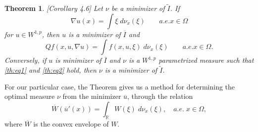 \documentclass[11pt]{article}
\newcommand{\R}{\mathbb{R}}
\theoremstyle{plain}
\newtheorem{Theorem}{Theorem}
\begin{document}
\begin{Theorem}\label{t:pedregal}\cite{pedregal2012parametrized}[Corollary 4.6]
Let $\nu$ be a minimizer of $\tilde{I}$. If 
\begin{equation}\label{th:eq1}
 \nabla u(x) = \int \xi \;d\nu_x(\xi)\qquad a.e. x \in \Omega \tag{*}
 \end{equation}
for $u \in W^{1,p}$, then $u$ is a minimizer of $\overline{I}$ and 
\begin{equation}\label{th:eq2}
Qf(x, u ,\nabla u) = \int f(x,u, \xi) \;d\nu_x(\xi) \qquad a.e. x \in \Omega. \tag{**}
\end{equation}
Conversely, if $u$ is  minimizer of $\overline{I}$ and $\nu$ is a $W^{1,p}$ parametrized measure such that \eqref{th:eq1} and \eqref{th:eq2} hold, then $\nu$ is a minimizer of $\tilde{I}$.
\end{Theorem}
 

For our particular case, the Theorem gives us a method for determining the optimal measure $\nu$ from the minimizer $\overline{u}$, through the relation
\begin{equation}\label{e:mean}
 \overline{W}(\overline{u}'(x)) = \int_\R W(\xi) \;d\nu_x(\xi), \quad a.e. \; x \in \Omega,
 \end{equation}
where $\overline{W}$ is the convex envelope of $W$.
\end{document}
